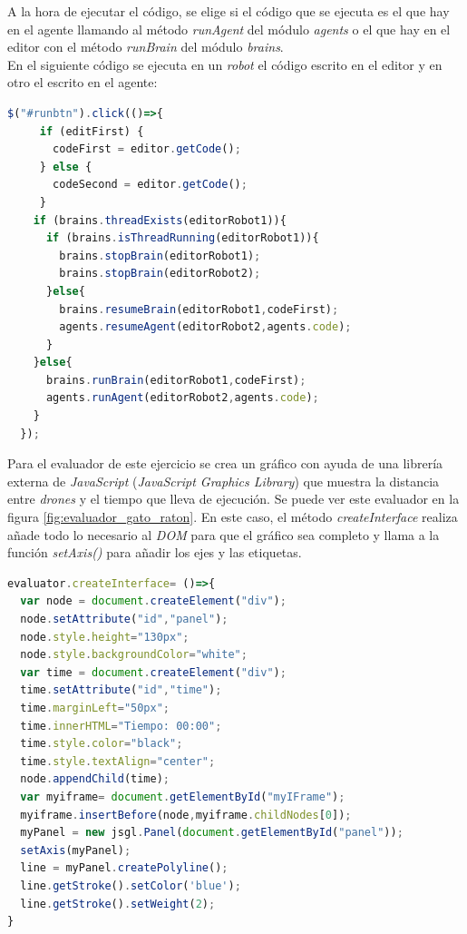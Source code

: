 A la hora de ejecutar el código, se elige si el código que se ejecuta es el que hay en el agente llamando al método \textit{runAgent} del módulo \textit{agents} o el que hay en el editor con el método \textit{runBrain} del módulo \textit{brains}. \\
En el siguiente código se ejecuta en un \textit{robot} el código escrito en el editor y en otro el escrito en el agente:

\begin{lstlisting}[language=javascript]
  $("#runbtn").click(()=>{
     if (editFirst) {
       codeFirst = editor.getCode();
     } else {
       codeSecond = editor.getCode();
     }
    if (brains.threadExists(editorRobot1)){
      if (brains.isThreadRunning(editorRobot1)){
        brains.stopBrain(editorRobot1);
        brains.stopBrain(editorRobot2);
      }else{
        brains.resumeBrain(editorRobot1,codeFirst);
        agents.resumeAgent(editorRobot2,agents.code);
      }
    }else{
      brains.runBrain(editorRobot1,codeFirst);
      agents.runAgent(editorRobot2,agents.code);
    }
  });\end{lstlisting}
  
  
Para el evaluador de este ejercicio se crea un gráfico con ayuda de una librería externa de \textit{JavaScript} (\textit{JavaScript Graphics Library}\cite{bib:jsgrafico}) que muestra la distancia entre \textit{drones} y el tiempo que lleva de ejecución. Se puede ver este evaluador en la figura \ref{fig:evaluador_gato_raton}. 
 En este caso, el método \textit{createInterface} realiza añade todo lo necesario al \textit{DOM} para que el gráfico sea completo y llama a la función \textit{setAxis()} para añadir los ejes y las etiquetas. \\
 
 \begin{lstlisting}[language=javascript,caption=Función que establece los ejes y etiquetas de la gráfica]
 evaluator.createInterface= ()=>{
  var node = document.createElement("div");
  node.setAttribute("id","panel");
  node.style.height="130px";
  node.style.backgroundColor="white";
  var time = document.createElement("div");
  time.setAttribute("id","time");
  time.marginLeft="50px";
  time.innerHTML="Tiempo: 00:00";
  time.style.color="black";
  time.style.textAlign="center";
  node.appendChild(time);
  var myiframe= document.getElementById("myIFrame");
  myiframe.insertBefore(node,myiframe.childNodes[0]);
  myPanel = new jsgl.Panel(document.getElementById("panel"));
  setAxis(myPanel);
  line = myPanel.createPolyline();
  line.getStroke().setColor('blue');
  line.getStroke().setWeight(2);
}
\end{lstlisting}

